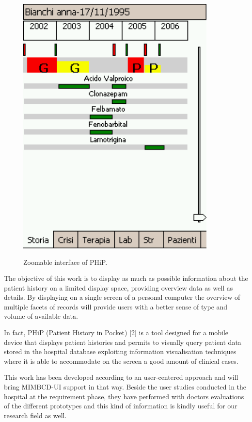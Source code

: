 \begin{figure}[!hbt]
\centering
\includegraphics[width=10cm]{images/zoomable}~\\
\caption{\label{fig:zoomable}Zoomable interface of PHiP.
}
\end{figure}

The objective of this work is to display as much as possible information about the patient history on a limited display space, providing overview data as well as details. By displaying on a single screen of a personal computer the overview of multiple facets of records will provide users with a better sense of type and volume of available data.

In fact, PHiP (Patient History in Pocket) [2] is a tool designed for a mobile device that displays patient histories and permits to visually query patient data stored in the hospital database exploiting information visualisation techniques where it is able to accommodate on the screen a good amount of clinical cases.

This work has been developed according to an user-centered approach and will bring MIMBCD-UI support in that way. Beside the user studies conducted in the hospital at the requirement phase, they have performed with doctors evaluations of the different prototypes and this kind of information is kindly useful for our research field as well.

